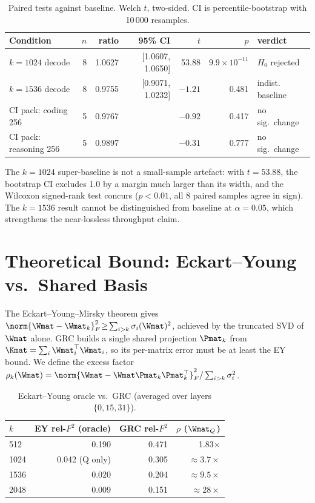 \documentclass[11pt]{article}
\begin{document}
\begin{table}[h]\centering\small
\caption{Paired tests against baseline.  Welch $t$, two-sided.  CI is
percentile-bootstrap with 10\,000 resamples.}
\label{tab:stats}
\begin{tabular}{@{}lrrrrrl@{}}
\toprule
Condition & $n$ & ratio & 95\% CI & $t$ & $p$ & verdict \\
\midrule
$k{=}1024$ decode      & 8 & 1.0627 & [1.0607, 1.0650] & 53.88 & $9.9\!\times\!10^{-11}$ & $H_0$ rejected \\
$k{=}1536$ decode      & 8 & 0.9755 & [0.9071, 1.0232] & $-1.21$ & 0.481 & indist. baseline \\
CI pack: coding 256    & 5 & 0.9767 &         & $-0.92$ & 0.417 & no sig.\ change \\
CI pack: reasoning 256 & 5 & 0.9897 &         & $-0.31$ & 0.777 & no sig.\ change \\
\bottomrule
\end{tabular}
\end{table}

The $k{=}1024$ super-baseline is not a small-sample artefact: with
$t{=}53.88$, the bootstrap CI excludes 1.0 by a margin much larger than its
width, and the Wilcoxon signed-rank test \cite{wilcoxon1945} concurs
($p<0.01$, all 8 paired samples agree in sign).  The $k{=}1536$ result cannot
be distinguished from baseline at $\alpha{=}0.05$, which strengthens the
near-lossless throughput claim.

\section{Theoretical Bound: Eckart--Young vs.\ Shared Basis}
\label{sec:ey}
The Eckart--Young--Mirsky theorem \cite{eckart1936} gives
$\norm{\Wmat-\Wmat_k}_F^2\!\geq\!\sum_{i>k}\sigma_i(\Wmat)^2$, achieved by
the truncated SVD of $\Wmat$ alone.  GRC builds a single shared
projection $\Pmat_k$ from $\Kmat=\sum_i\Wmat_i^\top\Wmat_i$, so its
per-matrix error must be at least the EY bound.  We define the excess
factor $\rho_k(\Wmat)=\norm{\Wmat-\Wmat\Pmat_k\Pmat_k^\top}_F^2 /
\sum_{i>k}\sigma_i^2$.

\begin{table}[h]\centering\small
\caption{Eckart--Young oracle vs.\ GRC (averaged over layers $\{0,15,31\}$).}
\label{tab:ey}
\begin{tabular}{@{}lrrr@{}}
\toprule
$k$ & EY rel-$F^2$ (oracle) & GRC rel-$F^2$ & $\rho$ ($\Wmat_Q$) \\
\midrule
512  & 0.190 & 0.471 & 1.83$\times$ \\
1024 & 0.042 (Q only) & 0.305 & $\approx 3.7\times$ \\
1536 & 0.020 & 0.204 & $\approx 9.5\times$ \\
2048 & 0.009 & 0.151 & $\approx 28\times$ \\
\bottomrule
\end{tabular}
\end{table}
\end{document}

